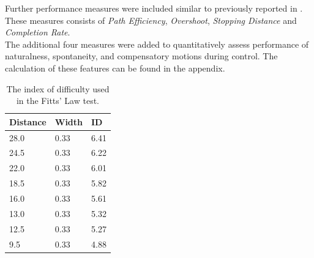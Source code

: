Further performance measures were included similar to previously reported in \cite{Scheme2013, Scheme2013a}. These measures consists of \textit{Path Efficiency}, \textit{Overshoot}, \textit{Stopping Distance} and \textit{Completion Rate}. \\
The additional four measures were added to quantitatively assess performance of naturalness, spontaneity, and compensatory motions during control. The calculation of these features can be found in the appendix. 
\begin{table}[H]
	\centering
	\caption{The index of difficulty used in the Fitts' Law test.}
	\label{tab:P:ID}
	\begin{tabular}{lll}
		
		Distance		 & Width	         & ID				   \\ \hline \hline
		28.0     & 0.33 & 6.41                \\ %
		24.5     & 0.33 & 6.22                \\ %
		22.0     & 0.33 & 6.01                \\ %
		18.5     & 0.33 & 5.82                \\ %
		16.0     & 0.33 & 5.61                \\ %
		13.0     & 0.33 & 5.32                \\ %
		12.5     & 0.33 & 5.27                \\ %
		9.5      & 0.33 & 4.88                \\ \hline \hline
	\end{tabular}
\end{table}
